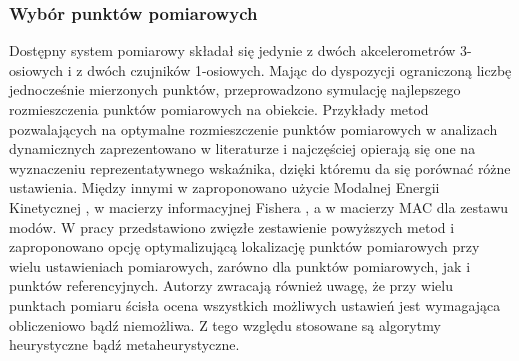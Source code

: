 \subsubsection{Wybór punktów pomiarowych} \label{sect:choose_measuremanet_locations}
Dostępny system pomiarowy składał się jedynie z dwóch akcelerometrów 3-osiowych i z dwóch czujników 1-osiowych.  Mając do dyspozycji ograniczoną liczbę jednocześnie mierzonych punktów, przeprowadzono symulację najlepszego rozmieszczenia punktów pomiarowych na obiekcie. Przykłady metod pozwalających na optymalne rozmieszczenie punktów pomiarowych w analizach dynamicznych zaprezentowano w literaturze i najczęściej opierają się one na wyznaczeniu reprezentatywnego wskaźnika, dzięki któremu da się porównać różne ustawienia. Między innymi w \cite{Kammer1991,Papadopoulos1998} zaproponowano użycie Modalnej Energii Kinetycznej , w \cite{Udwadia1994} macierzy informacyjnej Fishera , a w \cite{Penny1994,Allemang2003} macierzy MAC dla zestawu modów. W pracy \cite{Zhang2017} przedstawiono zwięzłe zestawienie powyższych metod i zaproponowano opcję optymalizującą lokalizację punktów pomiarowych przy wielu ustawieniach pomiarowych, zarówno dla punktów pomiarowych, jak i punktów referencyjnych. Autorzy zwracają również uwagę, że przy wielu punktach pomiaru ścisła ocena wszystkich możliwych ustawień jest wymagająca obliczeniowo bądź niemożliwa. Z tego względu stosowane są algorytmy heurystyczne bądź metaheurystyczne. 


